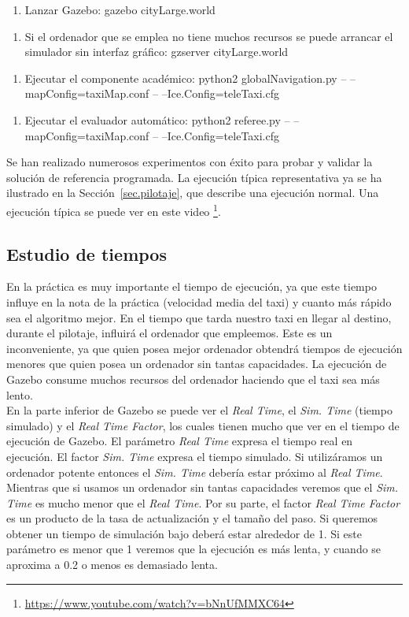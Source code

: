 \begin{enumerate}[1.]
    \item Lanzar Gazebo: gazebo cityLarge.world
\end{enumerate}
\begin{enumerate}[1b.]
\item Si el ordenador que se emplea no tiene muchos recursos se puede arrancar el simulador sin interfaz gráfico: gzserver cityLarge.world
\end{enumerate}
\begin{enumerate}[2.]
    \item Ejecutar el componente académico: python2 globalNavigation.py -- --mapConfig=taxiMap.conf -- --Ice.Config=teleTaxi.cfg
\end{enumerate}
\begin{enumerate}[3.]
  	\item Ejecutar el evaluador automático: python2 referee.py -- --mapConfig=taxiMap.conf -- --Ice.Config=teleTaxi.cfg
 \end{enumerate}

Se han realizado numerosos experimentos con éxito para probar y validar la solución de referencia programada. La ejecución típica representativa ya se ha ilustrado en la Sección~\ref{sec.pilotaje}, que describe una ejecución normal. Una ejecución típica se puede ver en este video \footnote{\url{https://www.youtube.com/watch?v=bNnUfMMXC64}}. 

\subsection{Estudio de tiempos}

En la práctica es muy importante el tiempo de ejecución, ya que este tiempo influye en la nota de la práctica (velocidad media del taxi) y cuanto más rápido sea el algoritmo mejor. En el tiempo que tarda nuestro taxi en llegar al destino, durante el pilotaje, influirá el ordenador que empleemos. Este es un inconveniente, ya que quien posea mejor ordenador obtendrá tiempos de ejecución menores que quien posea un ordenador sin tantas capacidades. La ejecución de Gazebo consume muchos recursos del ordenador haciendo que el taxi sea más lento. \\

En la parte inferior de Gazebo se puede ver el \textit{Real Time}, el \textit{Sim. Time} (tiempo simulado) y el \textit{Real Time Factor}, los cuales tienen mucho que ver en el tiempo de ejecución de Gazebo. El parámetro \textit{Real Time} expresa el tiempo real en ejecución. El factor \textit{Sim. Time} expresa el tiempo simulado. Si utilizáramos un ordenador potente entonces el \textit{Sim. Time} debería estar próximo al \textit{Real Time}. Mientras que si usamos un ordenador sin tantas capacidades veremos que el \textit{Sim. Time} es mucho menor que el \textit{Real Time}. Por su parte, el factor \textit{Real Time Factor} es un producto de la tasa de actualización y el tamaño del paso. Si queremos obtener un tiempo de simulación bajo deberá estar alrededor de 1. Si este parámetro es menor que 1 veremos que la ejecución es más lenta, y cuando se aproxima a 0.2 o menos es demasiado lenta.\\

